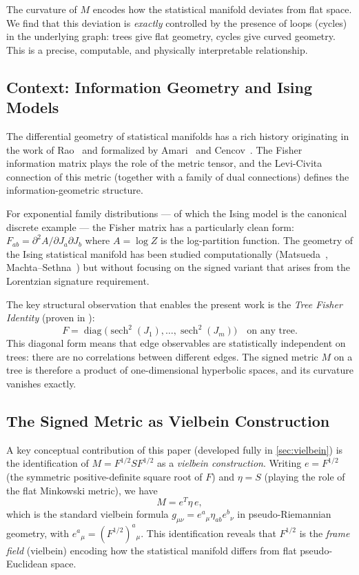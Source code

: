 \documentclass[11pt]{article}
\theoremstyle{definition}
\theoremstyle{remark}
\newcommand{\Fish}{F}
\newcommand{\sgn}{S}
\newcommand{\Met}{M}
\newcommand{\diag}{\operatorname{diag}}
\newcommand{\sech}{\operatorname{sech}}
\begin{document}
The curvature of $\Met$ encodes how the statistical manifold deviates
from flat space. We find that this deviation is \emph{exactly} controlled
by the presence of loops (cycles) in the underlying graph: trees give flat
geometry, cycles give curved geometry. This is a precise, computable, and
physically interpretable relationship.

\subsection{Context: Information Geometry and Ising Models}

The differential geometry of statistical manifolds has a rich history
originating in the work of Rao~\cite{Rao1945} and formalized by
Amari~\cite{Amari1998} and Cencov~\cite{Cencov1982}. The Fisher information
matrix plays the role of the metric tensor, and the Levi-Civita connection
of this metric (together with a family of dual connections) defines the
information-geometric structure.

For exponential family distributions --- of which the Ising model is the
canonical discrete example --- the Fisher matrix has a particularly clean
form: $\Fish_{ab} = \partial^2 A / \partial J_a \partial J_b$ where
$A = \log Z$ is the log-partition function. The geometry of the Ising
statistical manifold has been studied computationally
(Matsueda~\cite{Matsueda2013}, Machta--Sethna~\cite{Machta2013}) but without
focusing on the signed variant that arises from the Lorentzian signature
requirement.

The key structural observation that enables the present work is the
\emph{Tree Fisher Identity} (proven in \cite{Paper1}):
\begin{equation}
  \Fish = \diag\bigl(\sech^2(J_1), \ldots, \sech^2(J_m)\bigr)
  \quad \text{on any tree.}
  \label{eq:tree-fisher-intro}
\end{equation}
This diagonal form means that edge observables are statistically
independent on trees: there are no correlations between different edges.
The signed metric $\Met$ on a tree is therefore a product of one-dimensional
hyperbolic spaces, and its curvature vanishes exactly.

\subsection{The Signed Metric as Vielbein Construction}

A key conceptual contribution of this paper (developed fully in
\cref{sec:vielbein}) is the identification of $\Met = \Fish^{1/2} \sgn \Fish^{1/2}$
as a \emph{vielbein construction}. Writing $e = \Fish^{1/2}$ (the symmetric
positive-definite square root of $\Fish$) and $\eta = \sgn$ (playing the
role of the flat Minkowski metric), we have
\begin{equation}
  \Met = e^T \eta\, e,
  \label{eq:vielbein-intro}
\end{equation}
which is the standard vielbein formula $g_{\mu\nu} = e^a{}_\mu \eta_{ab} e^b{}_\nu$
in pseudo-Riemannian geometry,
with $e^a{}_\mu = (\Fish^{1/2})^a{}_\mu$. This identification reveals that
$\Fish^{1/2}$ is the \emph{frame field} (vielbein) encoding how the
statistical manifold differs from flat pseudo-Euclidean space.
\end{document}
